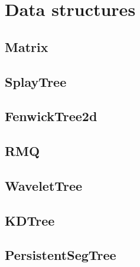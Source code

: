 \chapter{Data structures}

\section{Matrix}
\section{SplayTree}
\section{FenwickTree2d}
\section{RMQ}
\section{WaveletTree}
\section{KDTree}
\section{PersistentSegTree}
